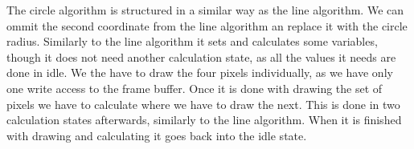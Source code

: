 The circle algorithm is structured in a similar way as the line algorithm. We can ommit the second coordinate from the line algorithm an replace it with the circle radius. Similarly to the line algorithm it sets and calculates some variables, though it does not need another calculation state, as all the values it needs are done in idle. We the have to draw the four pixels individually, as we have only one write access to the frame buffer. Once it is done with drawing the set of pixels we have to calculate where we have to draw the next. This is done in two calculation states afterwards, similarly to the line algorithm. When it is finished with drawing and calculating it goes back into the idle state.
